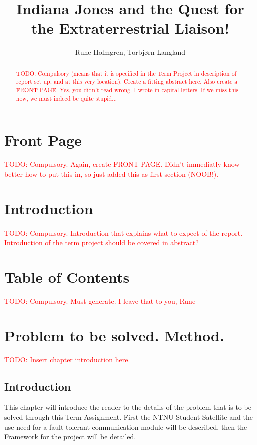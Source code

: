 \documentclass[a4paper]{IEEEtran}
\title{Indiana Jones and the Quest for the Extraterrestrial Liaison!}
\author{
    Rune Holmgren,
    Torbjørn Langland
}
\newcommand\TODO[1]{\textcolor{red}{TODO:#1}}
\newcommand\todo[1]{\TODO{#1}}
\begin{document}
\maketitle

\begin{abstract}
    \todo{ Compulsory (means that it is specified in the Term Project in description of report set up, and at this very location). Create a fitting abstract here. Also create a FRONT PAGE. Yes, you didn't read wrong. I wrote in capital letters. If we miss this now, we must indeed be quite stupid...}
\end{abstract}

\section{Front Page}
\todo{ Compulsory. Again, create FRONT PAGE. Didn't immediatly know better how to put this in, so just added this as first section (NOOB!). }

\section{Introduction}
\todo{ Compulsory. Introduction that explains what to expect of the report. Introduction of the term project should be covered in abstract? }

\section{Table of Contents}
\todo{ Compulsory. Must generate. I leave that to you, Rune}

\section{Problem to be solved. Method.}
\todo{ Insert chapter introduction here. }
\break
\subsection{Introduction}
This chapter will introduce the reader to the details of the problem that is to be solved through this Term Assignment. First the NTNU Student Satellite and the use need for a fault tolerant communication module will be described, then the Framework for the project will be detailed.
\end{document}
